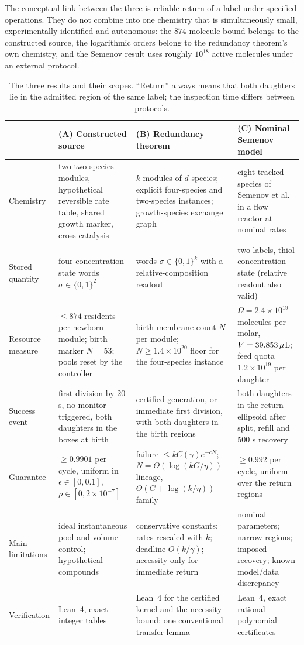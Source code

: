 The conceptual link between the three is reliable return of a label under specified operations. They do not combine into one chemistry that is simultaneously small, experimentally identified and autonomous: the $874$-molecule bound belongs to the constructed source, the logarithmic orders belong to the redundancy theorem's own chemistry, and the Semenov result uses roughly $10^{18}$ active molecules under an external protocol.

\begin{table}[t]
\centering\small
\caption{The three results and their scopes. ``Return'' always means that both daughters lie in the admitted region of the same label; the inspection time differs between protocols.}\label{tab:three}
\begin{tabular}{@{}>{\raggedright\arraybackslash}p{2.6cm}>{\raggedright\arraybackslash}p{3.9cm}>{\raggedright\arraybackslash}p{3.9cm}>{\raggedright\arraybackslash}p{3.9cm}@{}}
\toprule
 & (A) Constructed source & (B) Redundancy theorem & (C) Nominal Semenov model\\
\midrule
Chemistry & two two-species modules, hypothetical reversible rate table, shared growth marker, cross-catalysis & $k$ modules of $d$ species; explicit four-species and two-species instances; growth-species exchange graph & eight tracked species of Semenov et al.\ \citep{semenov2016} in a flow reactor at nominal rates\\
Stored quantity & four concentration-state words $\sigma\in\{0,1\}^2$ & words $\sigma\in\{0,1\}^k$ with a relative-composition readout & two labels, thiol concentration state (relative readout also valid)\\
Resource measure & $\le874$ residents per newborn module; birth marker $N=53$; pools reset by the controller & birth membrane count $N$ per module; $N\ge1.4\times10^{20}$ floor for the four-species instance & $\Omega=2.4\times10^{19}$ molecules per molar, $V=39.853\,\micro$L; feed quota $1.2\times10^{19}$ per daughter\\
Success event & first division by $20$ s, no monitor triggered, both daughters in the boxes at birth & certified generation, or immediate first division, with both daughters in the birth regions & both daughters in the return ellipsoid after split, refill and $500$ s recovery\\
Guarantee & $\ge0.9901$ per cycle, uniform in $\epsilon\in[0,0.1]$, $\rho\in[0,2\times10^{-7}]$ & failure $\le kC(\gamma)e^{-cN}$; $N=\Theta(\log(kG/\eta))$ lineage, $\Theta(G+\log(k/\eta))$ family & $\ge0.992$ per cycle, uniform over the return regions\\
Main limitations & ideal instantaneous pool and volume control; hypothetical compounds & conservative constants; rates rescaled with $k$; deadline $O(k/\gamma)$; necessity only for immediate return & nominal parameters; narrow regions; imposed recovery; known model/data discrepancy\\
Verification & Lean~4, exact integer tables & Lean~4 for the certified kernel and the necessity bound; one conventional transfer lemma & Lean~4, exact rational polynomial certificates\\
\bottomrule
\end{tabular}
\end{table}

